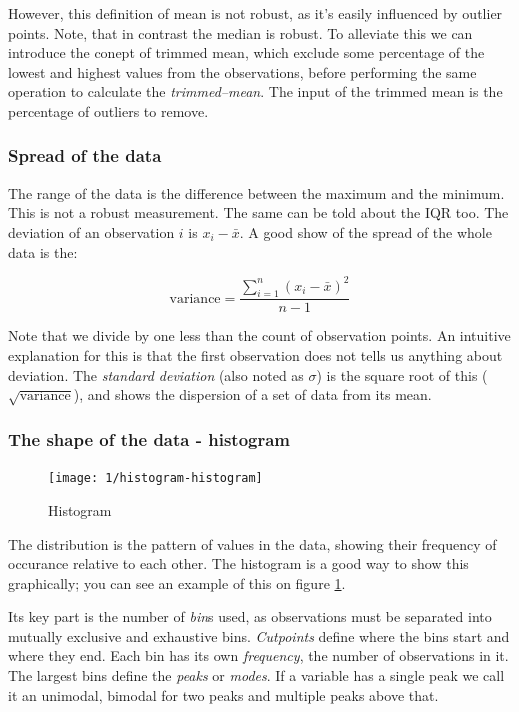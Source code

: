 However, this definition of mean is not robust, as it's easily influenced by
outlier points. Note, that in contrast the median is robust. To alleviate this
we can introduce the conept of trimmed mean, which exclude some percentage of
the lowest and highest values from the observations, before performing the same
operation to calculate the \emph{trimmed--mean}. The input of the trimmed mean
is the percentage of outliers to remove. 

\subsubsection{Spread of the data}

The range of the data is the difference between the maximum and the minimum.
This is not a robust measurement. The same can be told about the IQR too. The
deviation of an observation $i$ is $x_i - \bar{x}$. A good show of the spread of
the whole data is the:

\[ \mbox{variance} = \frac{\sum_{i=1}^{n}\left(x_i - \bar{x} \right)^2}{n-1}
\]

Note that we divide by one less than the count of observation points. An
intuitive explanation for this is that the first observation does not tells us
anything about deviation. The \emph{standard deviation} (also noted as $\sigma$)
is the square root of this ($\sqrt{\mbox{variance}}$), and shows the dispersion of a set of data from
its mean.

\subsubsection{The shape of the data - histogram}

\begin{figure}[htbp]
\label{fig:histogram}
\caption{Histogram}
\texttt{[image: 1/histogram-histogram]}
\end{figure}

The distribution is the pattern of values in the data, showing their frequency
of occurance relative to each other. The histogram is a good way to show this
graphically; you can see an example of this on figure \ref{fig:histogram}.

Its key part is the number of \emph{bin}s used, as observations must be
separated into mutually exclusive and exhaustive bins. \emph{Cutpoints} define
where the bins start and where they end. Each bin has its own \emph{frequency},
the number of observations in it. The largest bins define the \emph{peaks} or 
\emph{modes}. If a variable has a single peak we call it an unimodal, bimodal
for two peaks and multiple peaks above that.

